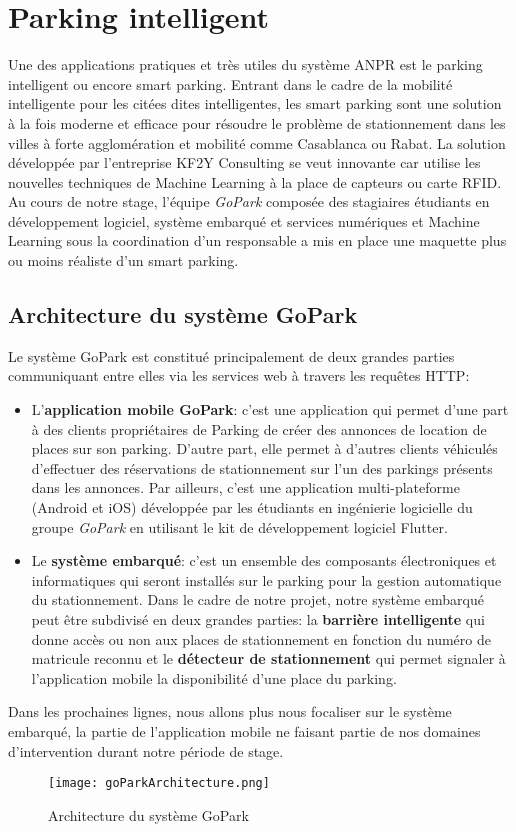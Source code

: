 \section{Parking intelligent}
Une des applications pratiques et très utiles du système ANPR est le parking intelligent ou encore smart parking. Entrant dans le cadre de la mobilité intelligente pour les citées dites intelligentes, les smart parking sont  une solution à la fois moderne et efficace pour résoudre le problème de stationnement dans les villes à forte agglomération et mobilité comme Casablanca ou Rabat. La solution développée par l’entreprise KF2Y Consulting se veut innovante car utilise les nouvelles techniques de Machine Learning à la place de capteurs ou carte RFID. Au cours de notre stage, l'équipe \textit{GoPark} composée des stagiaires étudiants en développement logiciel, système embarqué et services numériques et Machine Learning sous la coordination d’un responsable a mis en place une maquette plus ou moins réaliste d’un smart parking. 

    \subsection{Architecture du système GoPark}
Le système GoPark est constitué principalement de deux grandes parties communiquant entre elles via les services web à travers les requêtes HTTP: 
    \begin{itemize}
        \item L’\textbf{application mobile GoPark}: c’est une application qui permet d’une part à des clients propriétaires de Parking de créer des annonces de location de places sur son parking. D’autre part, elle permet à d’autres clients véhiculés d’effectuer des réservations de stationnement sur l’un des parkings présents dans les annonces. Par ailleurs, c'est une application multi-plateforme (Android et iOS) développée par les étudiants en ingénierie logicielle du groupe \textit{GoPark} en utilisant le kit de développement logiciel Flutter.
        \item Le \textbf{système embarqué}: c’est un ensemble des composants électroniques et informatiques qui seront installés sur le parking pour la gestion automatique du stationnement. Dans le cadre de notre projet, notre système embarqué peut être subdivisé en deux grandes parties: la \textbf{barrière intelligente} qui donne accès ou non aux places de stationnement en fonction du numéro de matricule reconnu et le \textbf{détecteur de stationnement} qui permet signaler à l'application mobile la disponibilité d'une place du parking.
    \end{itemize}
    Dans les prochaines lignes, nous allons plus nous focaliser sur le système embarqué, la partie de l'application mobile ne faisant partie de nos domaines d'intervention durant notre période de stage. 
    \begin{figure}
        \centering
        \texttt{[image: goParkArchitecture.png]}
        \caption{Architecture du système GoPark}
    \end{figure}


